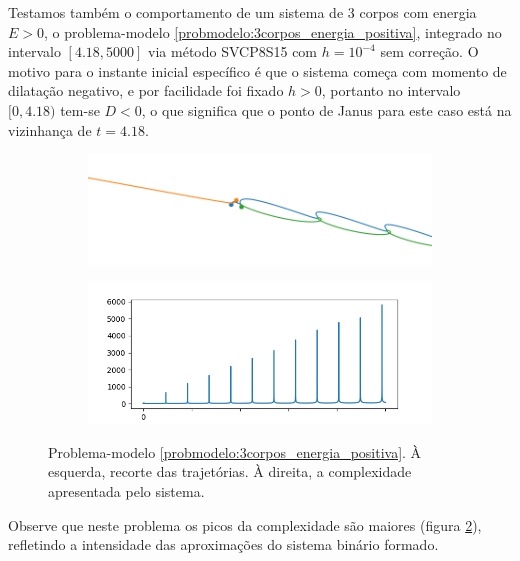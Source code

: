 Testamos também o comportamento de um sistema de 3 corpos com energia $E>0$, o problema-modelo \ref{probmodelo:3corpos_energia_positiva}, integrado no intervalo $[4.18,5000]$ via método SVCP8S15 com $h=10^{-4}$ sem correção. O motivo para o instante inicial específico é que o sistema começa com momento de dilatação negativo, e por facilidade foi fixado $h>0$, portanto no intervalo $[0,4.18)$ tem-se $D<0$, o que significa que o ponto de Janus para este caso está na vizinhança de $t=4.18$.

\begin{figure}[H]
    \centering
    \begin{subfigure}{.5\textwidth}
        \centering
        \includegraphics[width=0.8\linewidth]{tcc//img/3corpos_energiapositiva_posicoes_nd.png}
        \caption{}
        \label{fig:3corposenergiapositiva_trajetoria}
    \end{subfigure}%
    \begin{subfigure}{.5\textwidth}
        \centering
        \includegraphics[width=\linewidth]{tcc//img/3corpos_energiapositiva_complexidade.png}
        \caption{}
        \label{fig:3corpos_energiapositiva_complexidade}
    \end{subfigure}
    
    \caption{Problema-modelo \ref{probmodelo:3corpos_energia_positiva}. À esquerda, recorte das trajetórias. À direita, a complexidade apresentada pelo sistema.}
    \label{fig:figuras_probmodel3_energia_positiva}
\end{figure}

Observe que neste problema os picos da complexidade são maiores (figura \ref{fig:3corpos_energiapositiva_complexidade}), refletindo a intensidade das aproximações do sistema binário formado. 

